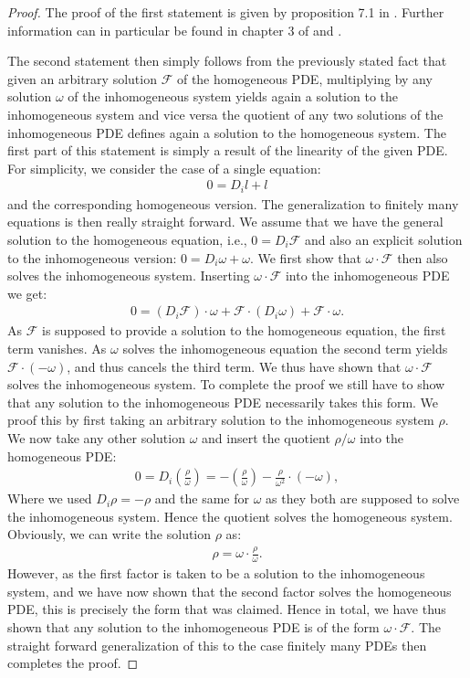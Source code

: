 \begin{proof}
The proof of the first statement is given by proposition 7.1 in \cite{seiler1994analysis}. Further information can in particular be found in chapter 3 of \cite{seiler2009involution} and \cite{articleCH}. 

The second statement then simply follows from the previously stated fact that given an arbitrary solution $\mathcal{F}$ of the homogeneous PDE, multiplying by any solution $\omega$ of the inhomogeneous system yields again a solution to the inhomogeneous system and vice versa the quotient of any two solutions of the inhomogeneous PDE defines again a solution to the homogeneous system. The first part of this statement is simply a result of the linearity of the given PDE. For simplicity, we consider the case of a single equation: 
\begin{align}
    0=D_i l + l 
\end{align}
and the corresponding homogeneous version. The generalization to finitely many equations is then really straight forward. 
We assume that we have the general solution to the homogeneous equation, i.e., $0 = D_i \mathcal{F}$ and also an explicit solution to the inhomogeneous version: $0 = D_i \omega + \omega$.
We first show that $\omega \cdot \mathcal{F}$ then also solves the inhomogeneous system. Inserting $\omega \cdot \mathcal{F}$ into the inhomogeneous PDE we get: 
\begin{align}
    0 = \left ( D_i \mathcal{F} \right ) \cdot \omega + \mathcal{F} \cdot \left ( D_i \omega \right) + \mathcal{F} \cdot \omega. 
\end{align}
As $\mathcal{F}$ is supposed to provide a solution to the homogeneous equation, the first term vanishes. As $\omega$ solves the inhomogeneous equation the second term yields $\mathcal{F} \cdot \left ( - \omega \right )$,
and thus cancels the third term. We thus have shown that $\omega \cdot \mathcal{F}$ solves the inhomogeneous system. To complete the proof we still have to show that any solution to the inhomogeneous PDE necessarily takes this form. We proof this by first taking an arbitrary solution to the inhomogeneous system $\rho$. We now take any other solution $\omega$ and insert the quotient $\rho/\omega$ into the homogeneous PDE:
\begin{align}
    0 = D_i \left (\frac{\rho}{\omega} \right) = - (\frac{\rho}{\omega}) - \frac{\rho}{\omega^2} \cdot (-\omega) ,
\end{align}
Where we used $D_i \rho = -\rho$ and the same for $\omega$ as they both are supposed to solve the inhomogeneous system. Hence the quotient solves the homogeneous system. Obviously, we can write the solution $\rho$ as: 
\begin{align}
    \rho = \omega \cdot  \frac{\rho}{\omega}.
\end{align}
However, as the first factor is taken to be a solution to the inhomogeneous system, and we have now shown that the second factor solves the homogeneous PDE, this is precisely the form that was claimed. 
Hence in total, we have thus shown that any solution to the inhomogeneous PDE is of the form $\omega \cdot \mathcal{F}$.
The straight forward generalization of this to the case finitely many PDEs then completes the proof.
\end{proof}
